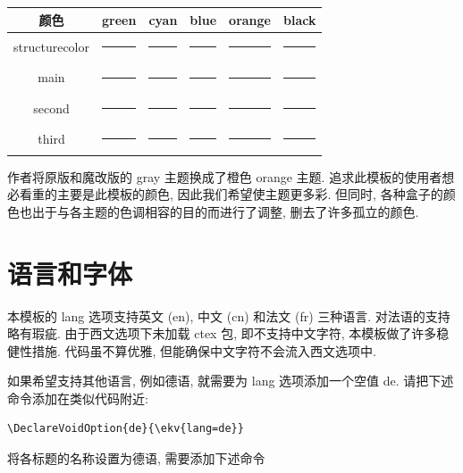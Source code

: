\documentclass[../book.tex]{subfiles}
\begin{document}
\begin{table}[htbp]
    \centering
    \begin{tabular}{c|ccccc}
        颜色 & green & cyan & blue & orange & black \\ \hline
        structurecolor & {\color[RGB]{0,195,110}\rule{1cm}{1cm}} & {\color[RGB]{31,186,190}\rule{1cm}{1cm}} & {\color[RGB]{0,174,247}\rule{1cm}{1cm}} & {\color[RGB]{255,154,24}\rule{1cm}{1cm}} & {\color[RGB]{0,0,0}\rule{1cm}{1cm}} \\ 
        main & {\color[RGB]{136,180,72}\rule{1cm}{1cm}} & {\color[RGB]{14,135,140}\rule{1cm}{1cm}} & {\color[RGB]{0,169,159}\rule{1cm}{1cm}} & {\color[RGB]{215,75,25}\rule{1cm}{1cm}} & {\color[RGB]{80,80,80}\rule{1cm}{1cm}} \\ 
        second & {\color[RGB]{255,134,24}\rule{1cm}{1cm}} & {\color[RGB]{245,122,143}\rule{1cm}{1cm}} & {\color[RGB]{255,154,24}\rule{1cm}{1cm}} & {\color[RGB]{130,212,28}\rule{1cm}{1cm}} & {\color[RGB]{120,120,120}\rule{1cm}{1cm}} \\ 
        third & {\color[RGB]{92,158,86}\rule{1cm}{1cm}} & {\color[RGB]{85,130,140}\rule{1cm}{1cm}} & {\color[RGB]{60,113,183}\rule{1cm}{1cm}} & {\color[RGB]{224,144,76}\rule{1cm}{1cm}} & {\color[RGB]{0,0,0}\rule{1cm}{1cm}}
    \end{tabular}
\end{table}

作者将原版和魔改版的 gray 主题换成了橙色 orange 主题. 追求此模板的使用者想必看重的主要是此模板的颜色, 因此我们希望使主题更多彩. 但同时, 各种盒子的颜色也出于与各主题的色调相容的目的而进行了调整, 删去了许多孤立的颜色.

\section{语言和字体}

本模板的 lang 选项支持英文 (en), 中文 (cn) 和法文 (fr) 三种语言. 对法语的支持略有瑕疵. 由于西文选项下未加载 ctex 包, 即不支持中文字符, 本模板做了许多稳健性措施. 代码虽不算优雅, 但能确保中文字符不会流入西文选项中. 

如果希望支持其他语言, 例如德语, 就需要为 lang 选项添加一个空值 de. 请把下述命令添加在类似代码附近:

\begin{lstlisting}
\DeclareVoidOption{de}{\ekv{lang=de}} 
\end{lstlisting}

将各标题的名称设置为德语, 需要添加下述命令
\end{document}
